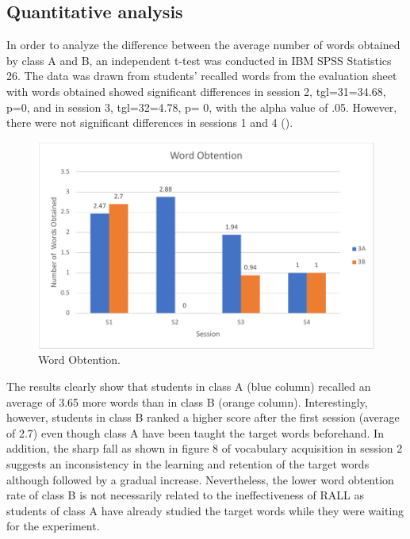 \documentclass[english]{textolivre}
\begin{document}
\subsection{Quantitative analysis}\label{sec-links}
In order to analyze the difference between the average number of words obtained by class A and B, an independent t-test was conducted in IBM SPSS Statistics 26. The data was drawn from students’ recalled words from the evaluation sheet with words obtained showed significant differences in session 2, tgl=31=34.68, p=0, and in session 3, tgl=32=4.78, p= 0, with the alpha value of .05. However, there were not significant differences in sessions 1 and 4 ().

\begin{figure}[h!]
\centering
\begin{minipage}{.85\textwidth}
 \includegraphics[width=\textwidth]{Fig8.pdf}
 \caption{Word Obtention.}
 \label{fig08}
\end{minipage}
\end{figure}

The results clearly show that students in class A (blue column) recalled an average of 3.65 more words than in class B (orange column). Interestingly, however, students in class B ranked a higher score after the first session (average of 2.7) even though class A have been taught the target words beforehand. In addition, the sharp fall as shown in figure 8 of vocabulary acquisition in session 2 suggests an inconsistency in the learning and retention of the target words although followed by a gradual increase. Nevertheless, the lower word obtention rate of class B is not necessarily related to the ineffectiveness of RALL as students of class A have already studied the target words while they were waiting for the experiment.
\end{document}
